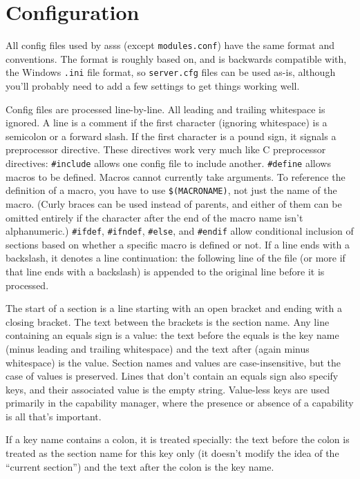 \documentclass{article}
\newcommand{\asss}{asss}
\begin{document}
\section{Configuration}

All config files used by \asss{} (except \verb/modules.conf/) have the
same format and conventions. The format is roughly based on, and is
backwards compatible with, the Windows \verb/.ini/ file format, so
\verb/server.cfg/ files can be used as-is, although you'll probably need
to add a few settings to get things working well.

Config files are processed line-by-line. All leading and trailing
whitespace is ignored. A line is a comment if the first character
(ignoring whitespace) is a semicolon or a forward slash. If the first
character is a pound sign, it signals a preprocessor directive. These
directives work very much like C preprocessor directives:
\verb/#include/ allows one config file to include another.
\verb/#define/ allows macros to be defined. Macros cannot currently take
arguments. To reference the definition of a macro, you have to use
\verb/$(MACRONAME)/, not just the name of the macro. (Curly braces can
be used instead of parents, and either of them can be omitted entirely
if the character after the end of the macro name isn't alphanumeric.)
\verb/#ifdef/, \verb/#ifndef/, \verb/#else/, and \verb/#endif/ allow
conditional inclusion of sections based on whether a specific macro is
defined or not. If a line ends with a backslash, it denotes a line
continuation: the following line of the file (or more if that line ends
with a backslash) is appended to the original line before it is
processed.

The start of a section is a line starting with an open bracket and
ending with a closing bracket. The text between the brackets is the
section name. Any line containing an equals sign is a value: the text
before the equals is the key name (minus leading and trailing
whitespace) and the text after (again minus whitespace) is the value.
Section names and values are case-insensitive, but the case of values is
preserved. Lines that don't contain an equals sign also specify keys,
and their associated value is the empty string. Value-less keys are used
primarily in the capability manager, where the presence or absence of a
capability is all that's important.

If a key name contains a colon, it is treated specially: the text before
the colon is treated as the section name for this key only (it doesn't
modify the idea of the ``current section'') and the text after the colon
is the key name.
\end{document}
